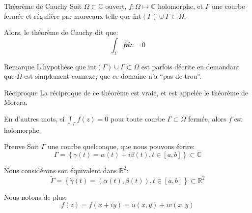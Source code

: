 \documentclass[a4paper]{article}
\begin{document}
\begin{parag}{Théorème de Cauchy}
    Soit $\Omega \subset \mathbb{C}$ ouvert, $f: \Omega \mapsto \mathbb{C}$ holomorphe, et $\Gamma$ une courbe fermée et régulière par morceaux telle que $\text{int}\left(\Gamma\right) \cup \Gamma \subset \Omega$.

    Alors, le théorème de Cauchy dit que: 
    \[\int_{\Gamma} fdz = 0\]

    \begin{subparag}{Remarque}
        L'hypothèse que $\text{int}\left(\Gamma\right) \cup \Gamma \subset \Omega$ est parfois décrite en demandant que $\Omega$ est simplement connexe; que ce domaine n'a ``pas de trou''.
    \end{subparag}
    
    \begin{subparag}{Réciproque}
        La réciproque de ce théorème est vraie, et est appelée le théorème de Morera. 

        En d'autres mots, si $\int_{\Gamma} f\left(z\right) = 0$ pour toute courbe $\Gamma \subset \Omega$ fermée, alors $f$ est holomorphe.
    \end{subparag}

    \begin{subparag}{Preuve}
        Soit $\Gamma$ une courbe quelconque, que nous pouvons écrire: 
        \[\Gamma = \left\{\gamma\left(t\right) = \alpha\left(t\right) + i\beta\left(t\right), t \in \left[a, b\right]\right\} \subset \mathbb{C}\]

        Nous considérons son équivalent dans $\mathbb{R}^2$: 
        \[\widetilde{\Gamma} = \left\{\widetilde{\gamma}\left(t\right) = \left(\alpha\left(t\right), \beta\left(t\right)\right), t \in \left[a, b\right]\right\} \subset \mathbb{R}^2\]
        
        Nous notons de plus: 
        \[f\left(z\right) = f\left(x + iy\right) = u\left(x, y\right) + iv\left(x, y\right)\]
        

\end{subparag}
\end{parag}
\end{document}
